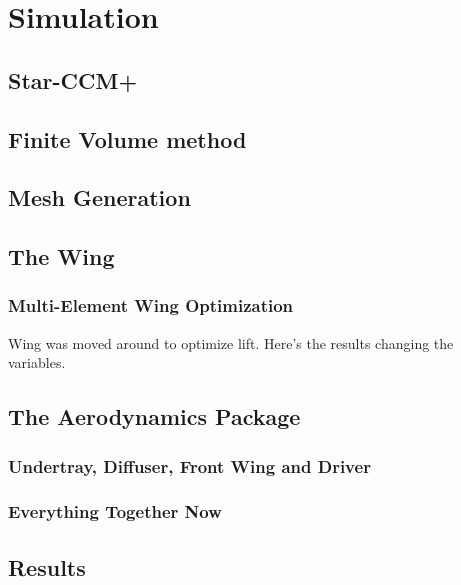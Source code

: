 \chapter{Simulation}

\section{Star-CCM+}

\section{Finite Volume method}
\section{Mesh Generation}
\section{The Wing}
\subsection{Multi-Element Wing Optimization}
Wing was moved around to optimize lift. Here's the results changing the variables.
\section{The Aerodynamics Package}
\subsection{Undertray, Diffuser, Front Wing and Driver}
\subsection{Everything Together Now}
\section{Results}
